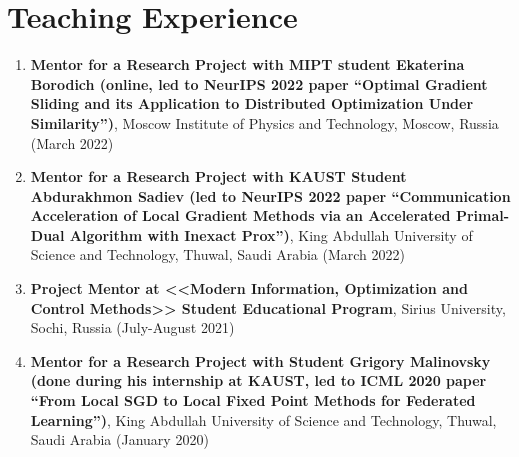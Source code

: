 \section{Teaching Experience}

\newcommand{\teaching}[3]{{\bf #1}, #2 (#3)}

\begin{enumerate}
	
	\item \teaching{Mentor for a Research Project with MIPT student Ekaterina Borodich (online, led to NeurIPS 2022 paper ``Optimal Gradient Sliding and its Application to Distributed Optimization Under Similarity'')}{Moscow Institute of Physics and Technology, Moscow, Russia}{March 2022}
	
	\item \teaching{Mentor for a Research Project with KAUST Student Abdurakhmon Sadiev (led to NeurIPS 2022 paper ``Communication Acceleration of Local Gradient Methods via an Accelerated Primal-Dual Algorithm with Inexact Prox'')}{King Abdullah University of Science and Technology, Thuwal, Saudi Arabia}{March 2022}
	
	
	
	\item \teaching{Project Mentor at <<Modern Information, Optimization and Control Methods>> Student Educational Program}{Sirius University, Sochi, Russia}{July-August 2021}
	
	\item \teaching{Mentor for a Research Project with Student Grigory Malinovsky (done during his internship at KAUST, led to ICML 2020 paper ``From Local SGD to Local Fixed Point Methods for Federated Learning'')}{King Abdullah University of Science and Technology, Thuwal, Saudi Arabia}{January 2020}
	
	
\end{enumerate}